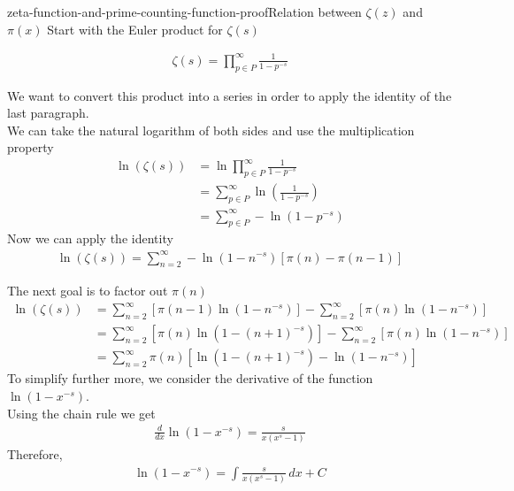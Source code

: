 \documentclass[preview]{standalone}
\begin{document}
\begin{snippetproof}{zeta-function-and-prime-counting-function-proof}{Relation between \(\zeta(z)\) and \(\pi(x)\)}
    Start with the Euler product for \(\zeta(s)\)

    \begin{align*}
        \zeta (s)=\prod_{p\in P}^{\infty}\frac{1}{1-p^{-s}}
    \end{align*}
    
    We want to convert this product into a series in order to apply the identity of the last paragraph.
    \\
    We can take the natural logarithm of both sides and use the multiplication property
    \begin{align*}
        \ln\left(\zeta (s)\right)&=\ln\prod_{p\in P}^{\infty}\frac{1}{1-p^{-s}}
        \\
        &=\sum_{p\in P}^{\infty}\ln\left(\frac{1}{1-p^{-s}}\right)
        \\
        &=\sum_{p\in P}^{\infty}-\ln\left(1-p^{-s}\right)
    \end{align*}
    Now we can apply the identity
    \begin{align*}
        \ln\left(\zeta (s)\right)=\sum_{n=2}^{\infty}-\ln\left(1-n^{-s}\right)\left[\pi (n) - \pi (n-1)\right]
    \end{align*}
    
    The next goal is to factor out \(\pi (n)\)
    \begin{align*}
        \ln\left(\zeta(s)\right)
        &=\sum_{n=2}^{\infty}\left[\pi (n-1)\ln\left(1-n^{-s}\right)\right]
        -\sum_{n=2}^{\infty}\left[\pi (n)\ln\left(1-n^{-s}\right)\right]
        \\&=\sum_{n=2}^{\infty}\left[\pi (n)\ln\left(1-{(n+1)}^{-s}\right)\right]
        -\sum_{n=2}^{\infty}\left[\pi (n)\ln\left(1-n^{-s}\right)\right]
        \\
        &=\sum_{n=2}^{\infty}\pi (n)\left[\ln\left(1-{(n+1)}^{-s}\right)-\ln\left(1-n^{-s}\right)\right]
    \end{align*}
    To simplify further more, we consider the derivative of the function \(\ln(1-x^{-s})\).
    \\
    Using the chain rule we get
    \begin{align*}
        \frac{d}{dx}\ln\left(1-x^{-s}\right)=
        \frac{s}{x(x^s-1)}
    \end{align*}
    Therefore,
    \begin{align*}
        \ln\left(1-x^{-s}\right)=
        \int \frac{s}{x(x^s-1)}\,dx+C
    \end{align*}
    

\end{snippetproof}
\end{document}
